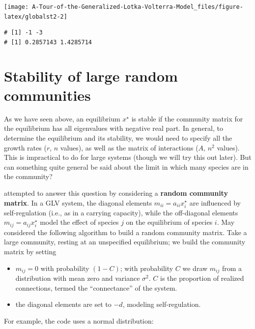\documentclass[]{book}
\providecommand{\tightlist}{%
  \setlength{\itemsep}{0pt}\setlength{\parskip}{0pt}}
\begin{document}
\begin{center}\texttt{[image: A-Tour-of-the-Generalized-Lotka-Volterra-Model\_files/figure-latex/globalst2-2]} \end{center}

\begin{verbatim}
# [1] -1 -3
# [1] 0.2857143 1.4285714
\end{verbatim}

\hypertarget{stability-of-large-random-communities}{%
\section{Stability of large random communities}\label{stability-of-large-random-communities}}

As we have seen above, an equilibrium \(x^\star\) is stable if the community matrix for the equilibrium has all eigenvalues with negative real part. In general, to determine the equilibrium and its stability, we would need to specify all the growth rates (\(r\), \(n\) values), as well as the matrix of interactions (\(A\), \(n^2\) values). This is impractical to do for large systems (though we will try this out later). But can something quite general be said about the limit in which many species are in the community?

\citet{may1972will} attempted to answer this question by considering a \textbf{random community matrix}. In a GLV system, the diagonal elements \(m_{ii} = a_{ii} x_i^\star\) are influenced by self-regulation (i.e., as in a carrying capacity), while the off-diagonal elements \(m_{ij} = a_{ij} x_i^\star\) model the effect of species \(j\) on the equilibrium of species \(i\). May considered the following algorithm to build a random community matrix. Take a large community, resting at an unspecified equilibrium; we build the community matrix by setting

\begin{itemize}
\tightlist
\item
  \(m_{ij} = 0\) with probability \((1-C)\); with probability \(C\) we draw \(m_{ij}\) from a distribution with mean zero and variance \(\sigma^2\). \(C\) is the proportion of realized connections, termed the ``connectance'' of the system.
\item
  the diagonal elements are set to \(-d\), modeling self-regulation.
\end{itemize}

For example, the code uses a normal distribution:
\end{document}

